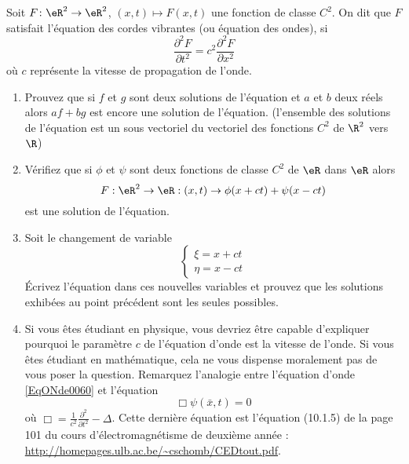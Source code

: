 
\begin{exercice}\label{exo0060}

Soit $F\colon \eR^2\to \eR^2$,  $(x,t) \mapsto F(x,t)$ une fonction de classe $C^2$. On dit que $F$ satisfait l'équation des cordes vibrantes (ou équation des ondes), si 
\begin{equation}		\label{EqONde0060}
	\frac{\partial^2 F}{\partial t^2 } = c^2 \frac{\partial^2 F}{\partial x^2}
\end{equation}
 où $c$ représente la vitesse de propagation de l'onde.

\begin{enumerate}
\item
Prouvez que si $f$ et $g$ sont deux solutions de l'équation et $a$ et $b$ deux réels alors $af+bg$ est  encore une solution de l'équation.  (l'ensemble des solutions de l'équation est un sous vectoriel du vectoriel des fonctions $C^2$ de $\R^2$ vers $\R$)
\item

Vérifiez que si $\phi$ et $\psi$ sont deux fonctions de classe $C^2$ de
$\eR$ dans $\eR$ alors
\[
F: \eR^2 \rightarrow \eR: (x,t) \rightarrow \phi(x+ct) + \psi(x-ct)
\]
est une solution de l'équation.
\item
Soit le changement de variable
\[
\left\{ \begin{array}{l} \xi = x + c t \\ \eta = x-ct \end{array} \right.
\]
Écrivez l'équation dans ces nouvelles variables et prouvez que les
solutions exhibées au point précédent sont les seules possibles.

\item
Si vous êtes étudiant en physique, vous devriez être capable d'expliquer pourquoi le paramètre $c$ de l'équation d'onde est la vitesse de l'onde. Si vous êtes étudiant en mathématique, cela ne vous dispense moralement pas de vous poser la question. Remarquez l'analogie entre l'équation d'onde \eqref{EqONde0060} et l'équation 
\begin{equation}
	\Box \psi(\bar x,t)=0
\end{equation}
où $\Box =\frac{1}{ c^2 }\frac{ \partial^2 }{ \partial t^2 }-\Delta$. Cette dernière équation est l'équation (10.1.5) de la page 101 du cours d'électromagnétisme de deuxième année :\\
\url{http://homepages.ulb.ac.be/~cschomb/CEDtout.pdf}.

\end{enumerate}


\end{exercice}
